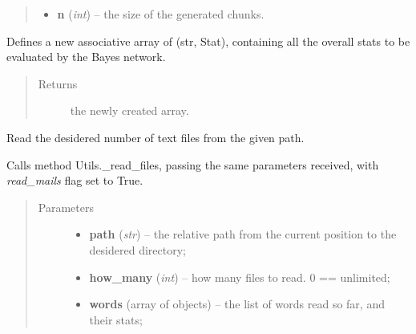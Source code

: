 \documentclass[letterpaper,10pt,english]{sphinxmanual}
\begin{document}
\begin{fulllineitems}
\begin{fulllineitems}
\begin{quote}
\begin{description}
\begin{itemize}
\item {} 
\textbf{n} (\emph{int}) -- the size of the generated chunks.

\end{itemize}

\end{description}\end{quote}

\end{fulllineitems}


\begin{fulllineitems}
\label{index:utils.Utils.create_stats}
Defines a new associative array of (str, Stat), containing all the
overall stats to be evaluated by the Bayes network.
\begin{quote}\begin{description}
\item[{Returns}] \leavevmode
the newly created array.

\end{description}\end{quote}

\end{fulllineitems}


\begin{fulllineitems}
\label{index:utils.Utils.read_mails}
Read the desidered number of text files from the given path.

Calls method Utils.\_read\_files, passing the same parameters received,
with \emph{read\_mails} flag set to True.
\begin{quote}\begin{description}
\item[{Parameters}] \leavevmode\begin{itemize}
\item {} 
\textbf{path} (\emph{str}) -- the relative path from the current position             to the desidered directory;

\item {} 
\textbf{how\_many} (\emph{int}) -- how many files to read. 0 == unlimited;

\item {} 
\textbf{words} (array of {\hyperref[index:gen_stat.Word]{}} objects) -- the list of words read so far, and their stats;


\end{itemize}
\end{description}
\end{quote}
\end{fulllineitems}
\end{fulllineitems}
\end{document}
